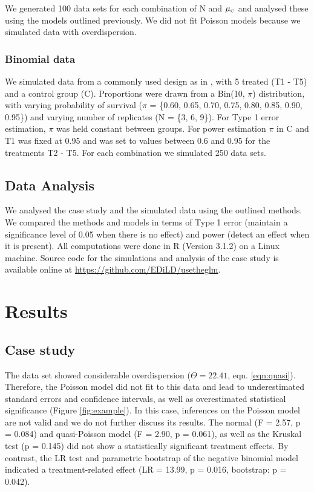 \documentclass{scrartcl}
\begin{document}
We generated 100 data sets for each combination of N and $\mu_\text{\tiny C}$ and analysed these using the models outlined previously.
We did not fit Poisson models because we simulated data with overdispersion.


\subsubsection{Binomial data}
We simulated data from a commonly used design as in \citep{weber_short-term_1989}, with 5 treated (T1 - T5) and a control group (C). 
Proportions were drawn from a Bin(10, $\pi$) distribution, with varying probability of survival ($\pi$ = \{0.60, 0.65, 0.70, 0.75, 0.80, 0.85, 0.90, 0.95\}) and varying number of replicates (N = \{3, 6, 9\}).
For Type 1 error estimation, $\pi$ was held constant between groups.
For power estimation $\pi$ in C and T1 was fixed at 0.95 and was set to values between 0.6 and 0.95 for the treatments T2 - T5. 
For each combination we simulated 250 data sets. 

\subsection{Data Analysis}
We analysed the case study and the simulated data using the outlined methods.
We compared the methods and models in terms of Type 1 error (maintain a significance level of 0.05 when there is no effect) and power (detect an effect when it is present).
All computations were done in R (Version 3.1.2) \citep{r_core_team_r:_2014} on a Linux machine.
Source code for the simulations and analysis of the case study is available online at \url{https://github.com/EDiLD/usetheglm}.



\section{Results}
\label{sec:results}
\subsection{Case study}
The data set showed considerable overdispersion ($\Theta = 22.41$, eqn. \ref{eqn:quasi}).
Therefore, the Poisson model did not fit to this data and lead to underestimated standard errors and confidence intervals, as well as overestimated statistical significance (Figure \ref{fig:example}).
In this case, inferences on the Poisson model are not valid and we do not further discuss its results.
The normal (F = 2.57, p = 0.084) and quasi-Poisson model (F = 2.90, p = 0.061), as well as the Kruskal test (p =  0.145) did not show a statistically significant treatment effects.
By contrast, the LR test and parametric bootstrap of the negative binomial model indicated a treatment-related effect (LR = 13.99, p = 0.016, bootstrap: p = 0.042).
\end{document}
